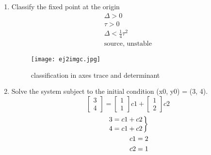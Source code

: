\documentclass[a4paper,10pt]{article}
\begin{document}
\begin{enumerate}
\begin{enumerate}
            \item Classify the fixed point at the origin
                \begin{equation}
                    \begin{aligned}
                        \Delta >0\\
                        \tau>0\\
                        \Delta <\frac{1}{4}\tau^{2}\\
                        \text{source, unstable}
                    \end{aligned}
                \end{equation}
               
                \begin{figure}[h]
                    \centering
                    \texttt{[image: ej2imgc.jpg]}
                    \caption{classification in axes trace and determinant}
                    \label{fig:mesh1}
                \end{figure}
            \item Solve the system subject to the initial condition (x0, y0) = (3, 4).
                \begin{equation}
                    \begin{bmatrix}
                        3\\
                        4
                    \end{bmatrix}
                        =
                    \begin{bmatrix}
                        1\\
                        1
                    \end{bmatrix}c1
                        +
                    \begin{bmatrix}
                        1\\
                        2
                    \end{bmatrix}c2
                \end{equation}
                \begin{equation}
                    \begin{aligned}
                        \left.
                        3= c1 + c2\atop
                        4= c1+ c2
                        \right\}\\
                        c1= 2\\
                        c2= 1\\

\end{aligned}
\end{equation}
\end{enumerate}
\end{enumerate}
\end{document}

